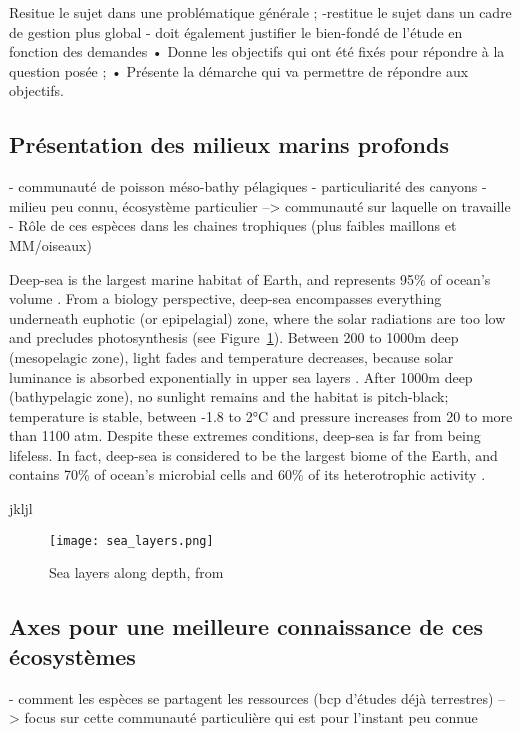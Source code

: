 

Resitue le sujet dans une problématique générale ;
 -restitue le sujet dans un cadre de gestion plus global
- doit également justifier le bien-fondé de l’étude en fonction des demandes
• Donne les objectifs qui ont été fixés pour répondre à la question posée ;
• Présente la démarche qui va permettre de répondre aux objectifs.


\subsection{Présentation des milieux marins profonds}
- communauté de poisson méso-bathy pélagiques 
- particuliarité des canyons 
- milieu peu connu, écosystème particulier --> communauté sur laquelle on travaille 
- Rôle de ces espèces dans les chaines trophiques (plus faibles maillons et MM/oiseaux)

Deep-sea is the largest marine habitat of Earth, and represents 95\% of ocean's volume \citep{danovaro2017,salazar2016}. From a biology perspective, deep-sea encompasses everything underneath euphotic (or epipelagial) zone, where the solar radiations are too low and precludes photosynthesis \citep{danovaro2017,salazar2016} (see Figure~\ref{fig:dsl}). Between 200 to 1000m deep (mesopelagic zone), light fades and temperature decreases, because solar luminance is absorbed exponentially in upper sea layers \citep{reynolds2001}. After 1000m deep (bathypelagic zone), no sunlight remains and the habitat is pitch-black; temperature is stable, between -1.8 to 2°C and pressure increases from 20 to more than 1100 atm. 
Despite these extremes conditions, deep-sea is far from being lifeless. In fact, deep-sea is considered to be the largest biome of the Earth, and contains 70\% of ocean's microbial cells and 60\% of its heterotrophic activity \citep{salazar2016}.

 
jkljl

\begin{figure} [!htbp]
	\begin{center}
		\texttt{[image: sea\_layers.png]}
	\end{center}
	\caption[Petite légende]{Sea layers along depth, from \citep{fig_deep_sea}}
	\label{fig:dsl}
\end{figure}



\subsection{Axes pour une meilleure connaissance de ces écosystèmes}
- comment les espèces se partagent les ressources (bcp d'études déjà terrestres)
         --> focus sur cette communauté particulière qui est pour l'instant peu connue

